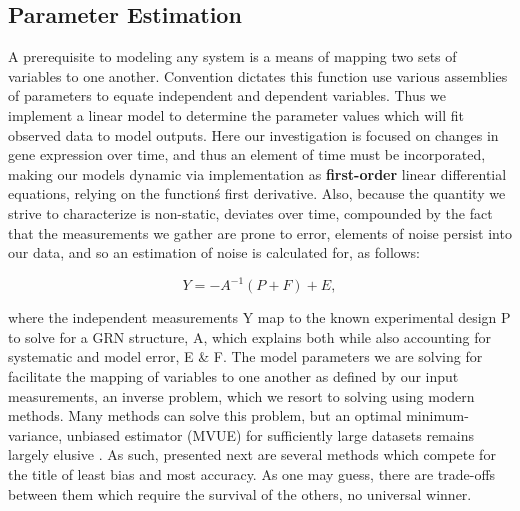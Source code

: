 \subsection{Parameter Estimation}
\label{sec:parest}
A prerequisite to modeling any system is a means of mapping two sets of variables to one another. Convention dictates this function use various assemblies of parameters to equate independent and dependent variables. Thus we implement a linear model to determine the parameter values which will fit observed data to model outputs. Here our investigation is focused on changes in gene expression over time, and thus an element of time must be incorporated, making our models dynamic via implementation as \textbf{first-order} linear differential equations, \ie relying on the function\'s first derivative. Also, because the quantity we strive to characterize is non-static, \ie deviates over time, compounded by the fact that the measurements we gather are prone to error, elements of noise persist into our data, and so an estimation of noise is calculated for, as follows:

\begin{equation}
\label{eq:Linearmap}
  Y = -A^{-1}(P+F)+ E,
\end{equation}

where the independent measurements Y map to the known experimental design P to solve for a GRN structure, A, which explains both while also accounting for systematic and model error, E \& F. The model parameters we are solving for facilitate the mapping of variables to one another as defined by our input measurements, \ie an inverse problem, which we resort to solving using modern methods. Many methods can solve this problem, but an optimal minimum-variance, unbiased estimator (MVUE) for sufficiently large datasets remains largely elusive \citep{kay1993fundamentals}. As such, presented next are several methods which compete for the title of least bias and most accuracy. As one may guess, there are trade-offs between them which require the survival of the others, \ie no universal winner.



